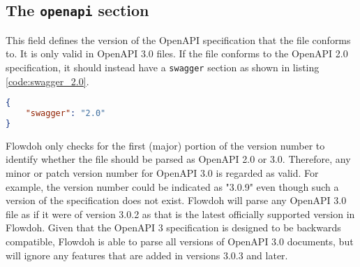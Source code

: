 \subsection{The \texttt{openapi} section}
This field defines the version of the OpenAPI specification that the file conforms to. It is only valid in OpenAPI 3.0 files. If the file conforms to the OpenAPI 2.0 specification, it should instead have a \texttt{swagger} section as shown in listing \ref{code:swagger_2.0}.\\
\begin{minipage}{\textwidth}
\begin{lstlisting}[caption={Alternative to the \texttt{openapi} section in OpenAPI 2.0},label={code:swagger_2.0},language=json]
{
    "swagger": "2.0"
}
\end{lstlisting}
\end{minipage}
Flowdoh only checks for the first (major) portion of the version number to identify whether the file should be parsed as OpenAPI 2.0 or 3.0. Therefore, any minor or patch version number for OpenAPI 3.0 is regarded as valid. For example, the version number could be indicated as "3.0.9" even though such a version of the specification does not exist. Flowdoh will parse any OpenAPI 3.0 file as if it were of version 3.0.2 as that is the latest officially supported version in Flowdoh. Given that the OpenAPI 3 specification is designed to be backwards compatible, Flowdoh is able to parse all versions of OpenAPI 3.0 documents, but will ignore any features that are added in versions 3.0.3 and later.
